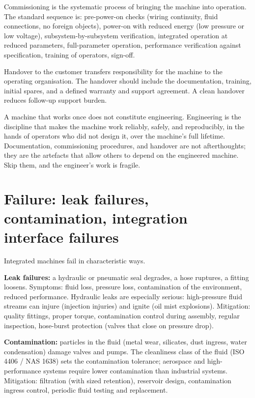 Commissioning is the systematic process of bringing the machine into operation. The standard sequence is: pre-power-on checks (wiring continuity, fluid connections, no foreign objects), power-on with reduced energy (low pressure or low voltage), subsystem-by-subsystem verification, integrated operation at reduced parameters, full-parameter operation, performance verification against specification, training of operators, sign-off.

Handover to the customer transfers responsibility for the machine to the operating organisation. The handover should include the documentation, training, initial spares, and a defined warranty and support agreement. A clean handover reduces follow-up support burden.

\begin{principle}
A machine that works once does not constitute engineering. Engineering is the discipline that makes the machine work reliably, safely, and reproducibly, in the hands of operators who did not design it, over the machine's full lifetime. Documentation, commissioning procedures, and handover are not afterthoughts; they are the artefacts that allow others to depend on the engineered machine. Skip them, and the engineer's work is fragile.
\end{principle}

\section{Failure: leak failures, contamination, integration interface failures}

Integrated machines fail in characteristic ways.

\textbf{Leak failures:} a hydraulic or pneumatic seal degrades, a hose ruptures, a fitting loosens. Symptoms: fluid loss, pressure loss, contamination of the environment, reduced performance. Hydraulic leaks are especially serious: high-pressure fluid streams can injure (injection injuries) and ignite (oil mist explosions). Mitigation: quality fittings, proper torque, contamination control during assembly, regular inspection, hose-burst protection (valves that close on pressure drop).

\textbf{Contamination:} particles in the fluid (metal wear, silicates, dust ingress, water condensation) damage valves and pumps. The cleanliness class of the fluid (ISO 4406 / NAS 1638) sets the contamination tolerance; aerospace and high-performance systems require lower contamination than industrial systems. Mitigation: filtration (with sized retention), reservoir design, contamination ingress control, periodic fluid testing and replacement.

